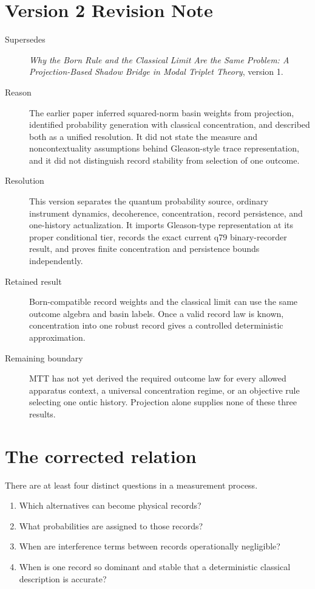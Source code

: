 \documentclass[11pt]{article}
\begin{document}
\section*{Version 2 Revision Note}
\begin{description}
\item[Supersedes] \emph{Why the Born Rule and the Classical Limit Are the Same
Problem: A Projection-Based Shadow Bridge in Modal Triplet Theory}, version 1.
\item[Reason] The earlier paper inferred squared-norm basin weights from
projection, identified probability generation with classical concentration,
and described both as a unified resolution. It did not state the measure and
noncontextuality assumptions behind Gleason-style trace representation, and it
did not distinguish record stability from selection of one outcome.
\item[Resolution] This version separates the quantum probability source,
ordinary instrument dynamics, decoherence, concentration, record persistence,
and one-history actualization. It imports Gleason-type representation at its
proper conditional tier, records the exact current q79 binary-recorder result,
and proves finite concentration and persistence bounds independently.
\item[Retained result] Born-compatible record weights and the classical limit
can use the same outcome algebra and basin labels. Once a valid record law is
known, concentration into one robust record gives a controlled deterministic
approximation.
\item[Remaining boundary] MTT has not yet derived the required outcome law for
every allowed apparatus context, a universal concentration regime, or an
objective rule selecting one ontic history. Projection alone supplies none of
these three results.
\end{description}

\tableofcontents

\section{The corrected relation}

There are at least four distinct questions in a measurement process.

\begin{enumerate}
\item Which alternatives can become physical records?
\item What probabilities are assigned to those records?
\item When are interference terms between records operationally negligible?
\item When is one record so dominant and stable that a deterministic classical
description is accurate?
\end{enumerate}
\end{document}
